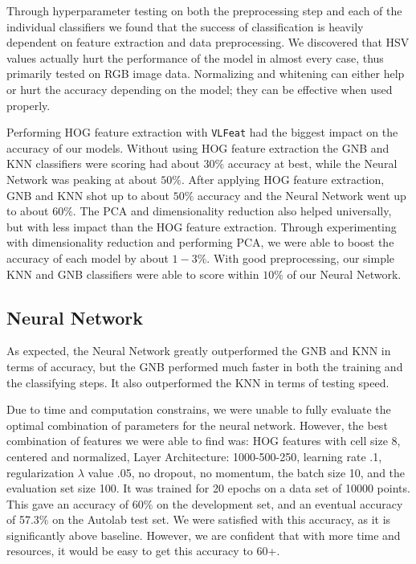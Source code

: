 \documentclass{article} %
\begin{document}
Through hyperparameter testing on both the preprocessing step and each of the individual classifiers we found that the success of classification is heavily dependent on feature extraction and data preprocessing. We discovered that HSV values actually hurt the performance of the model in almost every case, thus primarily tested on RGB image data. Normalizing and whitening can either help or hurt the accuracy depending on the model; they can be effective when used properly.

Performing HOG feature extraction with \verb|VLFeat| had the biggest impact on the accuracy of our models. Without using HOG feature extraction the GNB and KNN classifiers were scoring had about $30\%$ accuracy at best, while the Neural Network was peaking at about $50\%$. After applying HOG feature extraction, GNB and KNN shot up to about $50\%$ accuracy and the Neural Network went up to about $60\%$. The PCA and dimensionality reduction also helped universally, but with less impact than the HOG feature extraction. Through experimenting with dimensionality reduction and performing PCA, we were able to boost the accuracy of each model by about $1-3\%$. With good preprocessing, our simple KNN and GNB classifiers were able to score within $10\%$ of our Neural Network.

\subsection*{Neural Network}

As expected, the Neural Network greatly outperformed the GNB and KNN in terms of accuracy, but the GNB performed much faster in both the training and the classifying steps. It also outperformed the KNN in terms of testing speed.

Due to time and computation constrains, we were unable to fully evaluate the optimal combination of parameters for the neural network. However, the best combination of features we were able to find was: HOG features with cell size 8, centered and normalized, Layer Architecture: 1000-500-250, learning rate .1, regularization $\lambda$ value .05, no dropout, no momentum, the batch size 10, and the evaluation set size 100. It was trained for 20  epochs on a data set of 10000 points. This gave an accuracy of 60\% on the development set, and an eventual accuracy of 57.3\% on the Autolab test set. We were satisfied with this accuracy, as it is significantly above baseline. However, we are confident that with more time and resources, it would be easy to get this accuracy to 60+.
\end{document}
